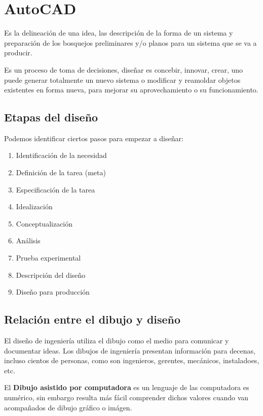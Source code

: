 \section{AutoCAD}

\begin{definition}[Diseño]
	Es la delineación de una idea, las descripción de la forma de un sistema y preparación de los bosquejos preliminares y/o planos para un sistema que se va a producir.
\end{definition}

\begin{definition}
	Es un proceso de toma de decisiones, diseñar es concebir, innovar, crear, uno puede generar totalmente un nuevo sistema o modificar y reamoldar objetos existentes en forma nueva, para mejorar su aprovechamiento o su funcionamiento.
\end{definition}

\subsection{Etapas del diseño}
Podemos identificar ciertos pasos para empezar a diseñar:
\begin{enumerate}
	\item Identificación de la necesidad
	\item Definición de la tarea (meta)
	\item Especificación de la tarea
	\item Idealización
	\item Conceptualización
	\item Análisis
	\item Prueba experimental
	\item Descripción del diseño
	\item Diseño para producción
\end{enumerate}

\subsection{Relación entre el dibujo y diseño}

El diseño de ingeniería utiliza el dibujo como el medio para comunicar y documentar ideas.
Los dibujos de ingeniería presentan información para decenas, incluso cientos de personas, como son ingenieros, gerentes, mecánicos, instaladoes, etc.

El \textbf{Dibujo asistido por computadora} es un lenguaje de las computadora es numérico, sin embargo resulta más fácil comprender dichos valores cuando van acompañados de dibujo gráfico o imágen.

